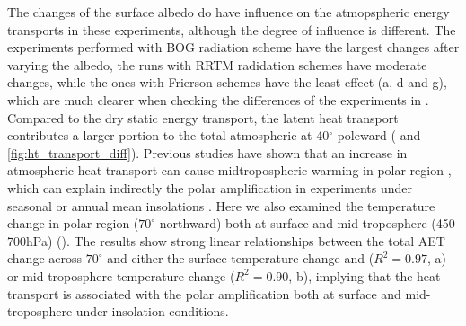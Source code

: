 
The changes of the surface albedo do have influence on the atmopspheric energy transports in these experiments, although the degree of influence is different. The experiments performed with BOG radiation scheme have the largest changes after varying the albedo, the runs with RRTM radidation schemes have moderate changes, while the ones with Frierson schemes have the least effect (a, d and g), which are much clearer when checking the differences of the experiments in . Compared to the dry static energy transport, the latent heat transport contributes a larger portion to the total atmospheric at 40$^\circ$ poleward ( and \ref{fig:ht_transport_diff}). Previous studies have shown that an increase in atmospheric heat transport can cause midtropospheric warming in polar region \citep[e.g.,][]{Screen2012}, which can explain indirectly the polar amplification in experiments under seasonal or annual mean insolations \citep{Kim2018}.  Here we also examined the temperature change in polar region ($70^\circ$ northward) both at surface and mid-troposphere (450-700hPa) (). The results show strong linear relationships between the total AET change across $70^\circ$ and either the surface temperature change and ($R^2=0.97$, a) or mid-troposphere temperature change ($R^2=0.90$, b), implying that the heat transport is associated with the polar amplification both at surface and mid-troposphere under insolation conditions.




